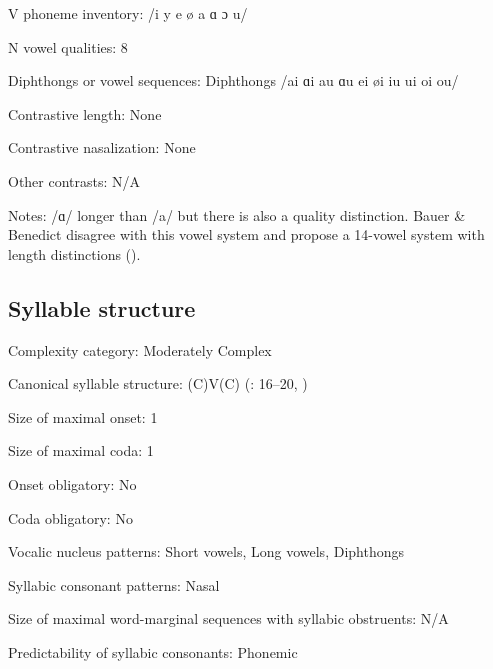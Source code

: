 {\begin{appendixdesc}
\item[V phoneme inventory:] /i y e ø a ɑ ɔ u/

\item[N vowel qualities:] 8

\item[Diphthongs or vowel sequences:] Diphthongs /ai ɑi au ɑu ei øi iu ui oi ou/

\item[Contrastive length:] None

\item[Contrastive nasalization:] None

\item[Other contrasts:] N/A

\item[Notes:] /ɑ/ longer than /a/ but there is also a quality distinction. Bauer \& Benedict disagree with this vowel system and propose a 14-vowel system with length distinctions (\citeyear[45--48]{BauerBenedict1997}).
\end{appendixdesc}
\subsection*{Syllable structure}
\begin{appendixdesc}

\item[Complexity category:] Moderately Complex

\item[Canonical syllable structure:] (C)V(C) (\citealt{MatthewsYip1994}: 16--20, \citealt{BauerBenedict1997})

\item[Size of maximal onset:] 1

\item[Size of maximal coda:] 1

\item[Onset obligatory:] No

\item[Coda obligatory:] No

\item[Vocalic nucleus patterns:] Short vowels, Long vowels, Diphthongs

\item[Syllabic consonant patterns:] Nasal

\item[Size of maximal word-marginal sequences with syllabic obstruents:] N/A

\item[Predictability of syllabic consonants:] Phonemic


\end{appendixdesc}}
